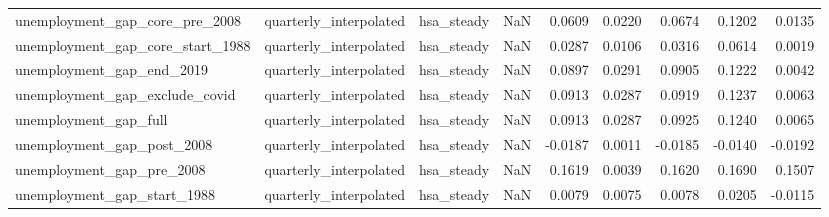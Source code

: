 \begin{tabular}{lllrrrrrr}
unemployment\_gap\_core\_pre\_2008 & quarterly\_interpolated & hsa\_steady & NaN & 0.0609 & 0.0220 & 0.0674 & 0.1202 & 0.0135 \\
unemployment\_gap\_core\_start\_1988 & quarterly\_interpolated & hsa\_steady & NaN & 0.0287 & 0.0106 & 0.0316 & 0.0614 & 0.0019 \\
unemployment\_gap\_end\_2019 & quarterly\_interpolated & hsa\_steady & NaN & 0.0897 & 0.0291 & 0.0905 & 0.1222 & 0.0042 \\
unemployment\_gap\_exclude\_covid & quarterly\_interpolated & hsa\_steady & NaN & 0.0913 & 0.0287 & 0.0919 & 0.1237 & 0.0063 \\
unemployment\_gap\_full & quarterly\_interpolated & hsa\_steady & NaN & 0.0913 & 0.0287 & 0.0925 & 0.1240 & 0.0065 \\
unemployment\_gap\_post\_2008 & quarterly\_interpolated & hsa\_steady & NaN & -0.0187 & 0.0011 & -0.0185 & -0.0140 & -0.0192 \\
unemployment\_gap\_pre\_2008 & quarterly\_interpolated & hsa\_steady & NaN & 0.1619 & 0.0039 & 0.1620 & 0.1690 & 0.1507 \\
unemployment\_gap\_start\_1988 & quarterly\_interpolated & hsa\_steady & NaN & 0.0079 & 0.0075 & 0.0078 & 0.0205 & -0.0115 \\
\bottomrule
\end{tabular}
